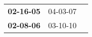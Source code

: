 \begin{supertabular}{p{0.33\columnwidth}p{0.33\columnwidth}p{0.33\columnwidth}}
 \textbf{02-16-05\textsuperscript{}} &  04-03-07\textsuperscript{} \\
 \textbf{02-08-06\textsuperscript{}} &  03-10-10\textsuperscript{} \\
\end{supertabular}

